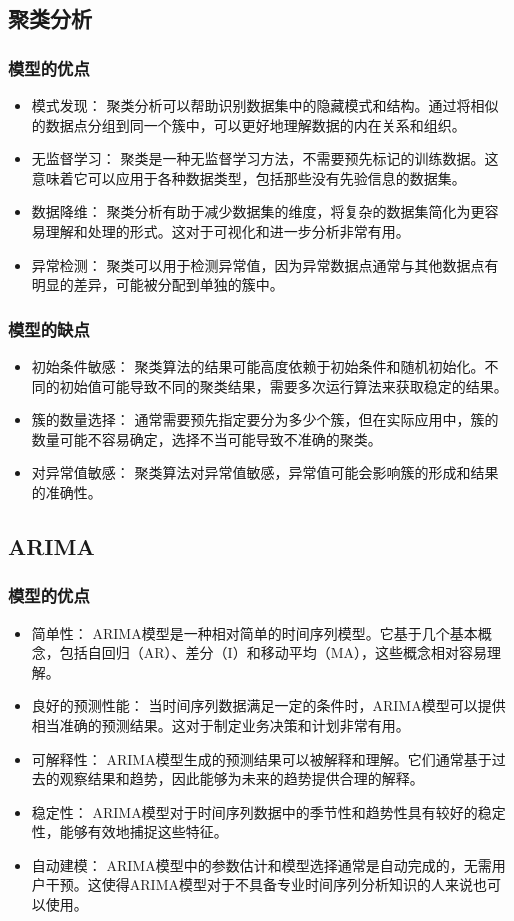 \documentclass[withoutpreface,bwprint]{cumcmthesis} %
\begin{document}
		\subsection{聚类分析}
\subsubsection{模型的优点}
\begin{itemize}
	\item 模式发现： 聚类分析可以帮助识别数据集中的隐藏模式和结构。通过将相似的数据点分组到同一个簇中，可以更好地理解数据的内在关系和组织。
	\item 无监督学习： 聚类是一种无监督学习方法，不需要预先标记的训练数据。这意味着它可以应用于各种数据类型，包括那些没有先验信息的数据集。
	\item 数据降维： 聚类分析有助于减少数据集的维度，将复杂的数据集简化为更容易理解和处理的形式。这对于可视化和进一步分析非常有用。
	\item 异常检测： 聚类可以用于检测异常值，因为异常数据点通常与其他数据点有明显的差异，可能被分配到单独的簇中。
\end{itemize}
\subsubsection{模型的缺点}
\begin{itemize}
	\item 初始条件敏感： 聚类算法的结果可能高度依赖于初始条件和随机初始化。不同的初始值可能导致不同的聚类结果，需要多次运行算法来获取稳定的结果。
	\item 簇的数量选择： 通常需要预先指定要分为多少个簇，但在实际应用中，簇的数量可能不容易确定，选择不当可能导致不准确的聚类。
	\item 对异常值敏感： 聚类算法对异常值敏感，异常值可能会影响簇的形成和结果的准确性。
\end{itemize}
	
		\subsection{ARIMA}
\subsubsection{模型的优点}
\begin{itemize}
	\item 简单性： ARIMA模型是一种相对简单的时间序列模型。它基于几个基本概念，包括自回归（AR）、差分（I）和移动平均（MA），这些概念相对容易理解。
	\item 良好的预测性能： 当时间序列数据满足一定的条件时，ARIMA模型可以提供相当准确的预测结果。这对于制定业务决策和计划非常有用。
	\item 可解释性： ARIMA模型生成的预测结果可以被解释和理解。它们通常基于过去的观察结果和趋势，因此能够为未来的趋势提供合理的解释。
	\item 稳定性： ARIMA模型对于时间序列数据中的季节性和趋势性具有较好的稳定性，能够有效地捕捉这些特征。
	\item 自动建模： ARIMA模型中的参数估计和模型选择通常是自动完成的，无需用户干预。这使得ARIMA模型对于不具备专业时间序列分析知识的人来说也可以使用。
\end{itemize}
\end{document}
